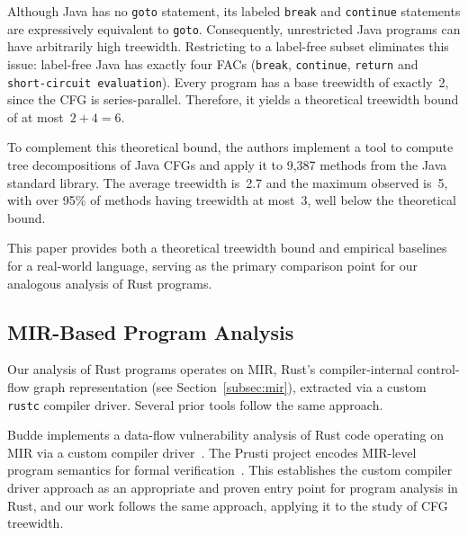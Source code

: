 Although Java has no \texttt{goto} statement, its labeled \texttt{break} and \texttt{continue} statements are expressively equivalent to \texttt{goto}.
Consequently, unrestricted Java programs can have arbitrarily high treewidth.
Restricting to a label-free subset eliminates this issue: label-free Java has exactly four FACs (\texttt{break}, \texttt{continue}, \texttt{return} and \texttt{short-circuit evaluation}).
Every program has a base treewidth of exactly~2, since the CFG is series-parallel.
Therefore, it yields a theoretical treewidth bound of at most~$2 + 4 = 6$.

To complement this theoretical bound, the authors implement a tool to compute tree decompositions of Java CFGs and apply it to 9{,}387 methods from the Java standard library.
The average treewidth is~2.7 and the maximum observed is~5, with over 95\% of methods having treewidth at most~3, well below the theoretical bound.

This paper provides both a theoretical treewidth bound and empirical baselines for a real-world language, serving as the primary comparison point for our analogous analysis of Rust programs.

\subsection{MIR-Based Program Analysis}
\label{subsec:rw-rust-analysis}

Our analysis of Rust programs operates on MIR, Rust's compiler-internal control-flow graph representation (see Section~\ref{subsec:mir}), extracted via a custom \texttt{rustc} compiler driver.
Several prior tools follow the same approach.

Budde implements a data-flow vulnerability analysis of Rust code operating on MIR via a custom compiler driver~\cite{budde_2024}.
The Prusti project encodes MIR-level program semantics for formal verification~\cite{astrauskas_2022}.
This establishes the custom compiler driver approach as an appropriate and proven entry point for program analysis in Rust, and our work follows the same approach, applying it to the study of CFG treewidth.
